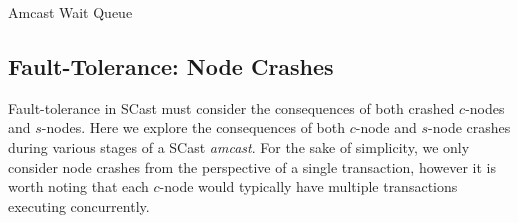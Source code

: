     \begin{algorithm}[H]
       \caption{Amcast Wait Queue}
        \label{ps:awq}
        \begin{algorithmic}[1]	        
	                
	                \ENDIF
	            \ENDIF
	            \ENDIF
	        \ENDWHILE
        \end{algorithmic}
    \end{algorithm}   
	\subsection{Fault-Tolerance: Node Crashes}\label{ssec:scast_fault_tolerance}
	Fault-tolerance in \textsf{SCast} must consider the consequences of both crashed $c$-nodes and $s$-nodes.  Here we explore the consequences of both $c$-node and $s$-node crashes during various stages of a \textsf{SCast} \emph{amcast}.  For the sake of simplicity, we only consider node crashes from the perspective of a single transaction, however it is worth noting that each $c$-node would typically have multiple transactions executing concurrently.  
	
